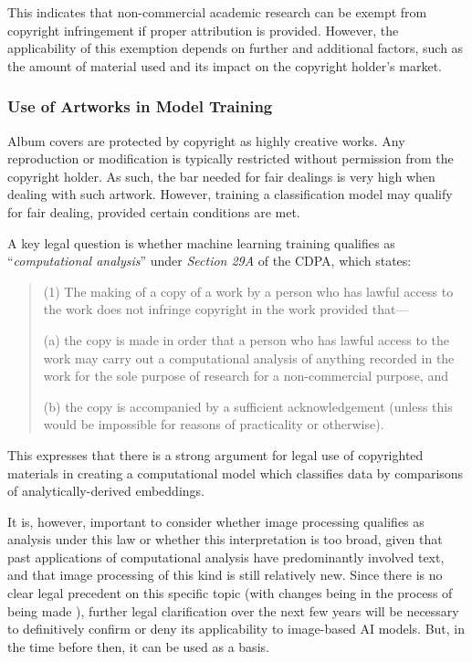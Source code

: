                   This indicates that non-commercial academic research can be exempt from copyright infringement if proper attribution is provided. However, the applicability of this exemption depends on further and additional factors, such as the amount of material used and its impact on the copyright holder’s market.
    
              \subsubsection{Use of Artworks in Model Training}
              
                  Album covers are protected by copyright as highly creative works. Any reproduction or modification is typically restricted without permission from the copyright holder. As such, the bar needed for fair dealings is very high when dealing with such artwork. However, training a classification model may qualify for fair dealing, provided certain conditions are met.
    
                  A key legal question is whether machine learning training qualifies as ``\textit{computational analysis}'' under \textit{Section 29A} of the CDPA, which states:
                  \begin{quote}
                      (1) The making of a copy of a work by a person who has lawful access to the work does not infringe copyright in the work provided that—
                  
                          (a) the copy is made in order that a person who has lawful access to the work may carry out a computational analysis of anything recorded in the work for the sole purpose of research for a non-commercial purpose, and
                          
                          (b) the copy is accompanied by a sufficient acknowledgement (unless this would be impossible for reasons of practicality or otherwise). \cite{cdpa1988}
                  \end{quote}
    
                  This expresses that there is a strong argument for legal use of copyrighted materials in creating a computational model which classifies data by comparisons of analytically-derived embeddings.
    
                  It is, however, important to consider whether image processing qualifies as analysis under this law or whether this interpretation is too broad, given that past applications of computational analysis have predominantly involved text, and that image processing of this kind is still relatively new. Since there is no clear legal precedent on this specific topic (with changes being in the process of being made \cite{guardian2024uk_ai_copyright}), further legal clarification over the next few years will be necessary to definitively confirm or deny its applicability to image-based AI models. But, in the time before then, it can be used as a basis.
    
